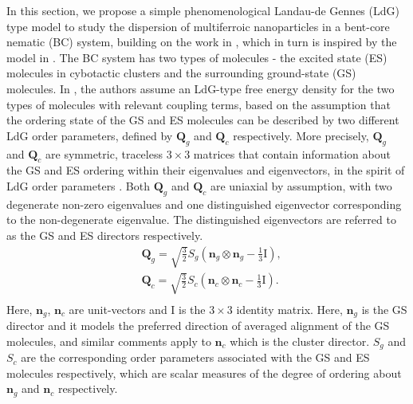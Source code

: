 \documentclass[reprint,amsfonts,amsmath,amssymb,aps,pre,floatfix,10pt]{revtex4-1}
\newcommand\n{\mathbf{n}}
\newcommand\Q{\mathbf{Q}}
\begin{document}
In this section, we propose a simple phenomenological Landau-de Gennes (LdG) type model to study the dispersion of
multiferroic nanoparticles in a bent-core nematic (BC) system, building on the work in \cite{patranabish2019one_37}, which in turn is inspired by the model in \cite{madhusudana2017two_36}. The BC system has two types of molecules - the excited state (ES) molecules in cybotactic clusters and the surrounding ground-state (GS) molecules. In \cite{patranabish2019one_37}, the authors assume an LdG-type free energy density for the two types of molecules with relevant coupling terms, based on the assumption that the ordering state of the GS and ES molecules can be described by two different LdG order parameters, defined by $\Q_g$ and $\Q_c$ respectively. More precisely, $\Q_g$ and $\Q_c$ are symmetric, traceless $3\times 3$ matrices that contain information about the GS and ES ordering within their eigenvalues and eigenvectors, in the spirit of LdG order parameters \cite{patranabish2019one_37}. Both $\Q_g$ and $\Q_c$ are uniaxial by assumption, with two degenerate non-zero eigenvalues and one distinguished eigenvector corresponding to the non-degenerate eigenvalue. The distinguished eigenvectors are referred to as the GS and ES directors respectively. 
\begin{equation} \label{eq:Q}
\begin{aligned}
& \Q_g = \sqrt{\frac{3}{2} } S_g \left( \n_g \otimes \n_g - \frac{1}{3} \mathrm{I} \right), \\
& \Q_c =   \sqrt{\frac{3}{2} } S_c \left( \n_c \otimes \n_c - \frac{1}{3} \mathrm{I} \right). \\
\end{aligned}
\end{equation} Here, $\n_g$, $\n_c$ are unit-vectors and $\mathrm{I}$ is the $3\times 3$ identity matrix.
Here, $\n_g$ is the GS director and it models the preferred direction of averaged alignment of the GS molecules, and similar comments apply to $\n_c$ which is the cluster director. $S_g$ and $S_c$ are the corresponding order parameters associated with the GS and ES molecules respectively, which are scalar measures of the degree of ordering about $\n_g$ and $\n_c$ respectively. %
\end{document}
